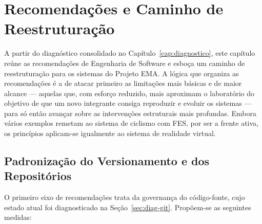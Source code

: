 \chapter{Recomendações e Caminho de Reestruturação}
\label{cap:proposta}

A partir do diagnóstico consolidado no Capítulo~\ref{cap:diagnostico}, este capítulo reúne as
recomendações de Engenharia de Software e esboça um caminho de reestruturação para os
sistemas do Projeto EMA. A lógica que organiza as recomendações é a de atacar primeiro as
limitações mais básicas e de maior alcance --- aquelas que, com esforço reduzido, mais
aproximam o laboratório do objetivo de que um novo integrante consiga reproduzir e evoluir os
sistemas --- para só então avançar sobre as intervenções estruturais mais profundas. Embora
vários exemplos remetam ao sistema de ciclismo com FES, por ser a frente ativa, os
princípios aplicam-se igualmente ao sistema de realidade virtual.

\section{Padronização do Versionamento e dos Repositórios}
\label{sec:prop-git}

O primeiro eixo de recomendações trata da governança do código-fonte, cujo estado atual foi
diagnosticado na Seção~\ref{sec:diag-git}. Propõem-se as seguintes medidas:

